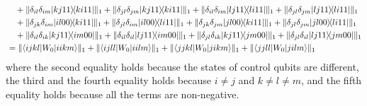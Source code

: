 \documentclass[a4paper,twocolumn,accepted=2022-10-23]{quantumarticle}
\newcommand{\bra}[1]{\langle {#1} \vert}
\newcommand{\ket}[1]{\vert {#1} \rangle}
\newcommand{\ketbra}[2]{\vert {#1} \rangle\!\langle {#2} \vert}
\theoremstyle{definition}
\begin{document}
\begin{align}
&\quad + \| \delta_{il}\delta_{im} \ketbra{kj11}{ki11} \|_1 + \| \delta_{jl}\delta_{jm} \ketbra{kj11}{ki11} \|_1
+ \| \delta_{il}\delta_{im} \ketbra{lj11}{li11} \|_1 + \| \delta_{jl}\delta_{jm} \ketbra{lj11}{li11} \|_1 \notag \\
&\quad + \| \delta_{jk}\delta_{im} \ketbra{il00}{ki11} \|_1 + \| \delta_{jl}\delta_{im} \ketbra{il00}{li11} \|_1
+ \| \delta_{jk}\delta_{jm} \ketbra{jl00}{ki11} \|_1 + \| \delta_{jl}\delta_{jm} \ketbra{jl00}{li11}  \|_1 \notag \\
&\quad + \| \delta_{il}\delta_{ik} \ketbra{kj11}{im00} \|_1 + \| \delta_{il}\delta_{il} \ketbra{lj11}{im00} \|_1
+ \| \delta_{jl}\delta_{ik} \ketbra{kj11}{jm00} \|_1 + \| \delta_{jl}\delta_{il} \ketbra{lj11}{jm00} \|_1 \\
%
&= \| \bra{ijkl} {W_0} \ket{iikm} \|_1 + \| \bra{ijll} {W_0} \ket{iilm} \|_1
+ \| \bra{jjkl} {W_0} \ket{jikm} \|_1 + \| \bra{jjll} {W_0} \ket{jilm} \|_1
\end{align}
where the second equality holds because the states of control qubits are different,
the third and the fourth equality holds because $i \neq j$ and $k \neq l \neq m$,
and the fifth equality holds because all the terms are non-negative.
\end{document}
